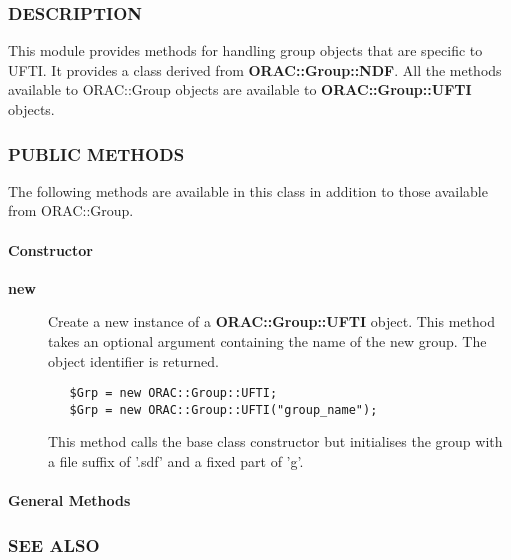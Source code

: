\begin{description}
\begin{description}
\subsubsection*{DESCRIPTION\label{ORAC::Group::UFTI_DESCRIPTION}}


This module provides methods for handling group objects that
are specific to UFTI. It provides a class derived from \textbf{ORAC::Group::NDF}.
All the methods available to ORAC::Group objects are available
to \textbf{ORAC::Group::UFTI} objects.

\subsubsection*{PUBLIC METHODS\label{ORAC::Group::UFTI_PUBLIC_METHODS}}


The following methods are available in this class in addition to
those available from ORAC::Group.

\paragraph*{Constructor\label{ORAC::Group::UFTI_Constructor}}
\begin{description}

\item[{\textbf{new}}] \mbox{}

Create a new instance of a \textbf{ORAC::Group::UFTI} object.
This method takes an optional argument containing the
name of the new group. The object identifier is returned.

\begin{verbatim}
   $Grp = new ORAC::Group::UFTI;
   $Grp = new ORAC::Group::UFTI("group_name");
\end{verbatim}


This method calls the base class constructor but initialises
the group with a file suffix of '.sdf' and a fixed part
of 'g'.

\end{description}
\paragraph*{General Methods\label{ORAC::Group::UFTI_General_Methods}}
\subsubsection*{SEE ALSO\label{ORAC::Group::UFTI_SEE_ALSO}}



\end{description}
\end{description}
